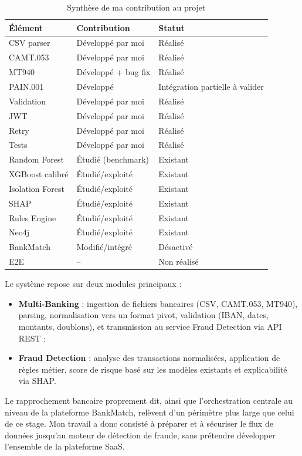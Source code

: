 \documentclass[12pt,a4paper]{extreport}
\begin{document}
\begin{table}[!htbp]
\centering
\caption{Synthèse de ma contribution au projet}
\label{tab:contribution}
\begin{tabular}{|p{3.5cm}|p{6cm}|p{2.5cm}|}
\hline
\textbf{Élément} & \textbf{Contribution} & \textbf{Statut} \\
\hline
CSV parser & Développé par moi & Réalisé \\
CAMT.053 & Développé par moi & Réalisé \\
MT940 & Développé + bug fix & Réalisé \\
PAIN.001 & Développé & Intégration partielle à valider \\
Validation & Développé par moi & Réalisé \\
JWT & Développé par moi & Réalisé \\
Retry & Développé par moi & Réalisé \\
Tests & Développé par moi & Réalisé \\
Random Forest & Étudié (benchmark) & Existant \\
XGBoost calibré & Étudié/exploité & Existant \\
Isolation Forest & Étudié/exploité & Existant \\
SHAP & Étudié/exploité & Existant \\
Rules Engine & Étudié/exploité & Existant \\
Neo4j & Étudié/exploité & Existant \\
BankMatch & Modifié/intégré & Désactivé \\
E2E & -- & Non réalisé \\
\hline
\end{tabular}
\end{table}

Le système repose sur deux modules principaux :

\begin{itemize}
    \item \textbf{Multi-Banking} : ingestion de fichiers bancaires (CSV, CAMT.053, MT940), parsing, normalisation vers un format pivot, validation (IBAN, dates, montants, doublons), et transmission au service Fraud Detection via API REST ; 
    \item \textbf{Fraud Detection} : analyse des transactions normalisées, application de règles métier, score de risque basé sur les modèles existants et explicabilité via SHAP.
\end{itemize}

Le rapprochement bancaire proprement dit, ainsi que l'orchestration centrale au niveau de la plateforme BankMatch, relèvent d'un périmètre plus large que celui de ce stage. Mon travail a donc consisté à préparer et à sécuriser le flux de données jusqu'au moteur de détection de fraude, sans prétendre développer l'ensemble de la plateforme SaaS.
\end{document}
